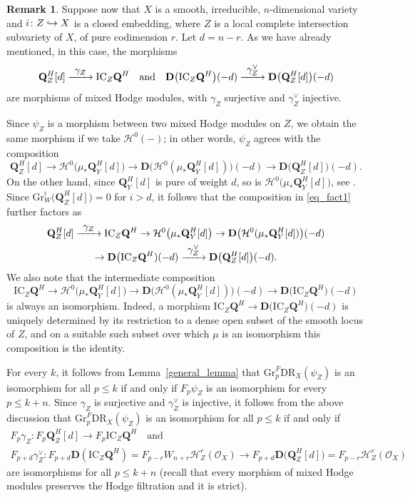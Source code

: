 \documentclass[11pt]{article}
\numberwithin{equation}{section}
\newcommand{\To}[1]{\mathchoice{\xrightarrow{\textstyle\kern4pt#1\kern3pt}}{\stackrel{#1}{\longrightarrow}}{}{}}
\newcommand\hto{\mathrel{\lhook\joinrel\to}}
\theoremstyle{plain}
\theoremstyle{definition}
\newtheorem{rmk}[thm]{Remark}
\newcommand\Q{{\mathbf Q}}
\newcommand\cH{\mathcal{H}}
\newcommand\cO{\mathcal{O}}
\newcommand\cH{\mathcal{H}}
\newcommand\cO{\mathcal{O}}
\newcommand\gr{\mathrm{Gr}}
\newcommand\DR{\mathrm{DR}}
\begin{document}
\begin{rmk}\label{rmk_two_morphisms}
Suppose now that $X$ is a smooth, irreducible, $n$-dimensional variety and $i\colon Z\hto X$ is a closed embedding,
where $Z$ is a local complete intersection subvariety of $X$, of pure codimension $r$. Let $d=n-r$.
As we have already mentioned, in this case, the morphisms
\[\Q^H_Z[d]\To{\gamma_Z}\mathrm{IC}_Z\Q^H\quad\text{and}\quad {\mathbf D}\big(\mathrm{IC}_Z\Q^H\big)(-d)
\To{\gamma_Z^{\vee}}{\mathbf D}\big(\Q^H_Z[d]\big)(-d)\]
are morphisms of mixed Hodge modules, with $\gamma_Z$ surjective and $\gamma_Z^{\vee}$ injective.

Since $\psi_Z$ is a morphism between two mixed Hodge modules on $Z$, we obtain the same morphism
if we take $\cH^0(-)$; in other words, $\psi_Z$ agrees with the composition
\begin{equation}\label{eq_fact1}
\Q_Z^H[d]\to \cH^0\big(\mu_*\Q_Y^H[d]\big)\to {\mathbf D}\big(\cH^0(\mu_*\Q_Y^H[d])\big)(-d)\to {\mathbf D}\big(\Q_Z^H[d]\big)(-d).
\end{equation}
On the other hand, since $\Q^H_Y[d]$ is pure of weight $d$, so is $\cH^0\big(\mu_*\Q_Y^H[d]\big)$, see \cite[(4.5.2)]{Saito_MHM}.
Since $\gr_W^i\big(\Q_Z^H[d]\big)=0$ for $i>d$, it follows that
the composition in \eqref{eq_fact1} further factors as
\begin{multline}\label{eq_fact2}
\Q_Z^H[d]\To{\gamma_Z} \mathrm{IC}_Z\Q^H\to \cH^0\big(\mu_*\Q_Y^H[d]\big)\to {\mathbf D}\big(\cH^0(\mu_*\Q_Y^H[d])\big)(-d)
\\
\to
{\mathbf D}\big(\mathrm{IC}_Z\Q^H)(-d)\To{\gamma_Z^{\vee}} {\mathbf D}\big(\Q_Z^H[d]\big)(-d).
\end{multline}
We also note that the intermediate composition
\[\mathrm{IC}_Z\Q^H\to \cH^0\big(\mu_*\Q_Y^H[d]\big)\to {\mathbf D}\big(\cH^0(\mu_*\Q_Y^H[d])\big)(-d)\to
{\mathbf D}\big(\mathrm{IC}_Z\Q^H)(-d)\]
is always an isomorphism. Indeed, a morphism $\mathrm{IC}_Z\Q^H\to {\mathbf D}\big(\mathrm{IC}_Z\Q^H)(-d)$ is uniquely determined
by its restriction to a dense open subset of the smooth locus of $Z$, and on a suitable such subset over which $\mu$ is an isomorphism
this composition is the identity.

For every $k$, it follows from Lemma~\ref{general_lemma} that $\gr_p^F\DR_X(\psi_Z)$ is an isomorphism for all $p\leq k$
if and only if $F_p\psi_Z$ is an isomorphism for every $p\leq k+n$. Since $\gamma_Z$ is surjective and $\gamma_Z^{\vee}$ is injective,
it follows from the above discussion that $\gr_p^F\DR_X(\psi_Z)$ is an isomorphism for all $p\leq k$ if and only if
\begin{gather*}
F_p\gamma_Z\colon F_p\Q_Z^H[d]\to F_p\mathrm{IC}_Z\Q^H\quad \text{and}\\
F_{p+d}\gamma_Z^{\vee} \colon F_{p+d}{\mathbf D}(\mathrm{IC}_Z\Q^H)=F_{p-r}W_{n+r}\cH^r_Z(\cO_X)\to
F_{p+d}{\mathbf D}\big(\Q_Z^H[d]\big)=F_{p-r}\cH_Z^r(\cO_X)
\end{gather*}
are isomorphisms for all $p\leq k+n$ (recall that every morphism of mixed Hodge modules preserves the Hodge filtration and it is strict).
\end{rmk}
\end{document}
